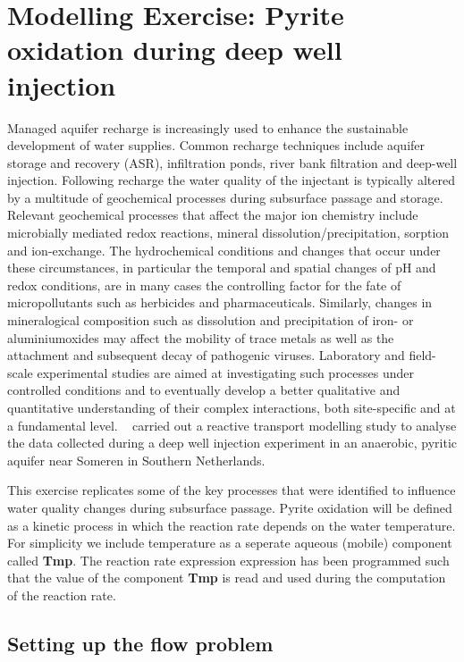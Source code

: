 \newpage
\section[Modelling Exercise: Pyrite oxidation during deep well injection]{Modelling Exercise: Pyrite oxidation during deep well injection}

Managed aquifer recharge is increasingly used to enhance the sustainable development of water supplies. Common recharge techniques include aquifer storage and recovery (ASR), infiltration ponds, river bank filtration and deep-well injection. Following recharge the water quality of the injectant is typically altered by a multitude of geochemical processes during subsurface passage and storage. Relevant geochemical processes that affect the major ion chemistry include microbially mediated redox reactions, mineral dissolution/precipitation, sorption and ion-exchange. The hydrochemical conditions and changes that occur under these circumstances, in particular the temporal and spatial changes of pH and redox conditions, are in many cases the controlling factor for the fate of micropollutants such as herbicides and pharmaceuticals. Similarly, changes in mineralogical composition such as dissolution and precipitation of iron- or aluminiumoxides may affect the mobility of trace metals as well as the attachment and subsequent decay of pathogenic viruses. Laboratory and field-scale experimental studies are aimed at investigating such processes under controlled conditions and to eventually develop a better qualitative and quantitative understanding of their complex interactions, both site-specific and at a fundamental level. \
\cite{prommer_stuyfzand_2005} carried out a reactive transport 
modelling study to analyse the data collected during a deep well 
injection experiment in an anaerobic, pyritic aquifer near Someren in Southern Netherlands. 

This exercise replicates some of the key processes that were identified
to influence water quality changes during subsurface passage. 
Pyrite oxidation will be defined as a kinetic process in which the
reaction rate depends on the water temperature. 
For simplicity we include temperature as a seperate aqueous (mobile) component
called {\color{red} \textbf{Tmp}}.
The reaction rate expression expression has been programmed such 
that the value of the component {\color{red} \textbf{Tmp}} is read
and used during the computation of the reaction rate. 

\subsection[Setting up the flow problem]{Setting up the flow problem}

